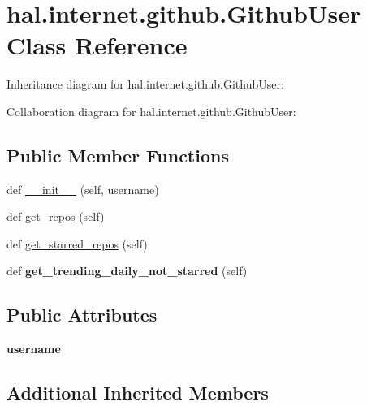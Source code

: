 \hypertarget{classhal_1_1internet_1_1github_1_1_github_user}{}\section{hal.\+internet.\+github.\+Github\+User Class Reference}
\label{classhal_1_1internet_1_1github_1_1_github_user}


Inheritance diagram for hal.\+internet.\+github.\+Github\+User\+:


Collaboration diagram for hal.\+internet.\+github.\+Github\+User\+:
\subsection*{Public Member Functions}
\begin{DoxyCompactItemize}
\item 
def \hyperlink{classhal_1_1internet_1_1github_1_1_github_user_a045563a8b0c55793d7a054a38ac8e6e7}{\+\_\+\+\_\+init\+\_\+\+\_\+} (self, username)
\item 
def \hyperlink{classhal_1_1internet_1_1github_1_1_github_user_a61ee4bb9d16a50058a8d5e125ef5197f}{get\+\_\+repos} (self)
\item 
def \hyperlink{classhal_1_1internet_1_1github_1_1_github_user_a4affc82985348023676461d9ee29d513}{get\+\_\+starred\+\_\+repos} (self)
\item 
def {\bfseries get\+\_\+trending\+\_\+daily\+\_\+not\+\_\+starred} (self)\hypertarget{classhal_1_1internet_1_1github_1_1_github_user_a15a4fec1eb59b1227c7167ef2b45eb49}{}\label{classhal_1_1internet_1_1github_1_1_github_user_a15a4fec1eb59b1227c7167ef2b45eb49}

\end{DoxyCompactItemize}
\subsection*{Public Attributes}
\begin{DoxyCompactItemize}
\item 
{\bfseries username}\hypertarget{classhal_1_1internet_1_1github_1_1_github_user_ad7989a82d32e1a582e5847e87cacb2c0}{}\label{classhal_1_1internet_1_1github_1_1_github_user_ad7989a82d32e1a582e5847e87cacb2c0}

\end{DoxyCompactItemize}
\subsection*{Additional Inherited Members}


